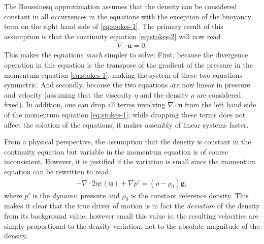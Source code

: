 \documentclass{article}
\begin{document}
The Boussinesq approximation assumes that the density can be
considered constant in all occurrences in the equations with the exception of
the buoyancy term on the right hand side of \eqref{eq:stokes-1}. The primary
result of this assumption is that the continuity equation \eqref{eq:stokes-2}
will now read
\begin{gather*}
  \nabla \cdot \mathbf u = 0.
\end{gather*}
This makes the equations \textit{much} simpler to solve: First, because the
divergence operation in this equation is the transpose of the gradient of the
pressure in the momentum equation \eqref{eq:stokes-1}, making the system of
these two equations symmetric. And secondly, because the two equations are now
linear in pressure and velocity (assuming that the viscosity $\eta$ and the
density $\rho$ are considered fixed). In addition, one can drop all terms
involving $\nabla \cdot \mathbf u$ from the left hand side of the momentum
equation \eqref{eq:stokes-1}; while dropping these terms does not
affect the solution of the equations, it makes assembly of linear systems
faster. 

From a physical perspective, the assumption that the density is constant in
the continuity equation but variable in the momentum equation is of course
inconsistent. However, it is justified if the variation is small since the
momentum equation can be rewritten to read
\begin{gather*}
  -\nabla \cdot 2\eta \varepsilon(\mathbf u) + \nabla p' =
  (\rho-\rho_0) \mathbf g,
\end{gather*}
where $p'$ is the \textit{dynamic} pressure and $\rho_0$ is the constant
reference density. This makes it clear that the true driver of motion is in
fact the \textit{deviation} of the density from its background value, however
small this value is: the resulting velocities are simply proportional to the
density variation, not to the absolute magnitude of the density.
\end{document}
